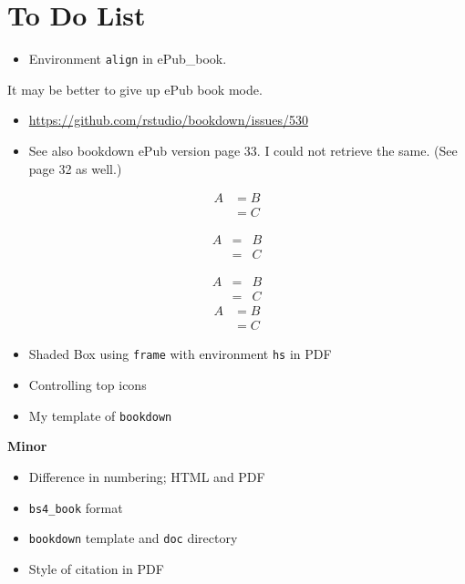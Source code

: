 \documentclass[
]{book}
\providecommand{\tightlist}{%
  \setlength{\itemsep}{0pt}\setlength{\parskip}{0pt}}
\theoremstyle{definition}
\theoremstyle{definition}
\theoremstyle{definition}
\theoremstyle{definition}
\theoremstyle{remark}
\begin{document}
\hypertarget{to-do-list}{%
\section{To Do List}\label{to-do-list}}

\begin{itemize}
\tightlist
\item
  Environment \texttt{align} in ePub\_book.
\end{itemize}

It may be better to give up ePub book mode.

\begin{itemize}
\tightlist
\item
  \url{https://github.com/rstudio/bookdown/issues/530}
\item
  See also bookdown ePub version page 33. I could not retrieve the same. (See page 32 as well.)
\end{itemize}

\begin{align}
A & = B\\
& = C
\end{align}

\begin{eqnarray*}
A &=& B\\
& = & C
\end{eqnarray*}

\[
\begin{array}{lcl}
A & \!\!=\!\! & B\\
& \!\!=\!\! & C
\end{array}
\]
\begin{equation}
\begin{split}
A & = B\\
& = C
\end{split}
\label{eq:var-beta}
\end{equation}

\begin{itemize}
\tightlist
\item
  Shaded Box using \texttt{frame} with environment \texttt{hs} in PDF
\item
  Controlling top icons
\item
  My template of \texttt{bookdown}
\end{itemize}

\textbf{Minor}

\begin{itemize}
\tightlist
\item
  Difference in numbering; HTML and PDF
\item
  \texttt{bs4\_book} format
\item
  \texttt{bookdown} template and \texttt{doc} directory
\item
  Style of citation in PDF
\end{itemize}

  

\printindex
\end{document}
